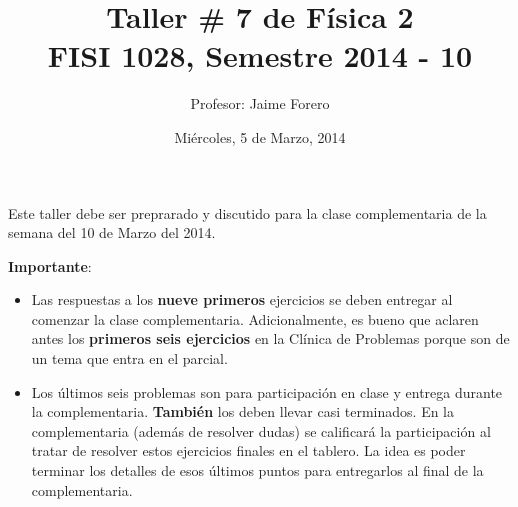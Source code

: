 \documentclass{article}
\title{Taller \# 7 de F\'isica 2\\ FISI 1028, Semestre 2014 - 10}
\author{Profesor: Jaime Forero}
\date{Mi\'ercoles, 5 de Marzo, 2014}
\begin{document}
\maketitle
\thispagestyle{empty}

\noindent

Este taller debe ser preprarado y discutido para la clase
complementaria de la semana del 10 de Marzo del 2014. 

\noindent
{\bf Importante}:
\begin{itemize}

\item
Las respuestas a los {\bf nueve primeros} ejercicios se deben entregar
al comenzar la clase complementaria. Adicionalmente, es bueno que
aclaren antes los {\bf primeros seis ejercicios} en la Cl\'inica de
Problemas porque son de un tema que entra en el parcial.  
\item 

Los \'ultimos seis problemas son para participaci\'on en clase y entrega
durante la complementaria. {\bf{Tambi\'en}} los deben llevar casi
terminados. En la complementaria (adem\'as de resolver dudas) se
calificar\'a la participaci\'on al tratar de resolver estos ejercicios
finales en el tablero. La idea es poder terminar los  detalles de esos
\'ultimos puntos para entregarlos al final de la complementaria.
\end{itemize}
\end{document}
